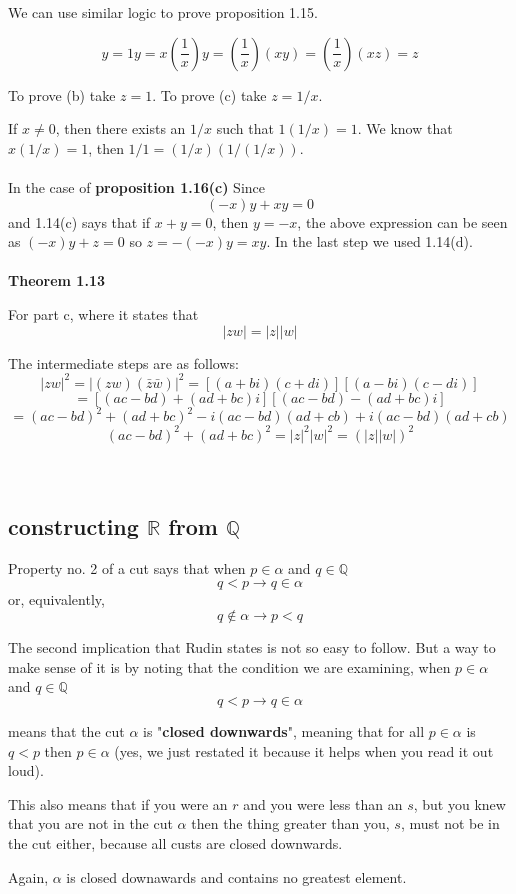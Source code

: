 We can use similar logic to prove proposition 1.15.

$$
y = 1y = x \left(\frac{1}{x}\right) y = \left(\frac{1}{x}\right) (xy)
= \left(\frac{1}{x}\right) (xz) = z
$$

To prove (b) take $z=1$.
To prove (c) take $z = 1/x$.

If $x\neq 0$, then there exists an $1/x$ such that $1 (1/x) = 1$.
We know that $x(1/x) = 1$, then $1/1 = (1/x)(1/(1/x))$.
\\~\\

In the case of \textbf{proposition 1.16(c)}
Since
$$
(-x)y + xy = 0
$$
and 1.14(c) says that if $x+y = 0$, then $y=-x$, the above expression can be seen as $(-x)y + z = 0$
so $z = -(-x)y = xy$.
In the last step we used 1.14(d).
\\~\\


\textbf{Theorem 1.13}

For part c, where it states that
$$
|zw| = |z| |w|
$$

The intermediate steps are as follows:
$$
|zw|^2 = |(zw)(\bar{z}\bar{w})|^2 = \left[ (a+bi)(c+di) \right] \left[ (a-bi)(c-di) \right] 
$$
$$
= \left[ (ac - bd) + (ad + bc)i \right] \left[ (ac - bd) - (ad + bc)i \right]
$$
$$
= (ac - bd)^2 + (ad + bc)^2 - i(ac - bd)(ad + cb) + i(ac - bd)(ad + cb)
$$
$$
(ac - bd)^2 + (ad + bc)^2 = |z|^2 |w|^2 = \left( |z||w| \right)^2
$$
\\~\\



\subsection{constructing $\mathbb{R}$ from $\mathbb{Q}$}

Property no. 2 of a cut says that when $p\in\alpha$ and $q\in\mathbb{Q}$
$$
q < p \rightarrow q\in\alpha
$$
or, equivalently,
$$
q\notin\alpha \rightarrow p < q
$$

The second implication that Rudin states is not so easy to follow.
But a way to make sense of it is by noting that the condition we are examining,
when $p\in\alpha$ and $q\in\mathbb{Q}$
$$
q < p \rightarrow q\in\alpha
$$

means that the cut $\alpha$ is "\textbf{closed downwards}", meaning that for all
$p\in\alpha$ is $q < p$ then $p\in\alpha$ (yes, we just restated it because it helps when you read it out loud).

This also means that if you were an $r$ and you were less than an $s$, but you knew that
you are not in the cut $\alpha$ then the thing greater than you, $s$, must not be in the cut either,
because all custs are closed downwards.

Again, $\alpha$ is closed downawards and contains no greatest element.
\\~\\